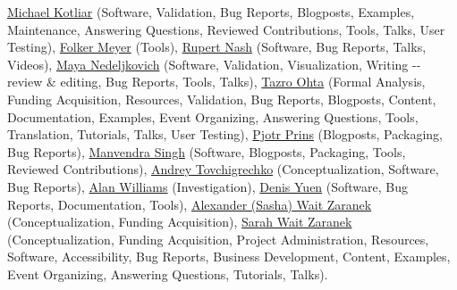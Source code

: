 \documentclass[sigconf,revew,screen,timestamp,nonacm]{acmart}
\newcommand{\contributor}[3]
{\normalsize\href{#1}{#2} \small(#3)\normalsize}
\begin{document}
\begin{acks}
\contributor{https://orcid.org/0000-0002-6486-3898}{Michael Kotliar}{Software, Validation, Bug Reports, Blogposts, Examples, Maintenance, Answering Questions, Reviewed Contributions, Tools, Talks, User Testing},
\contributor{https://orcid.org/0000-0003-1112-2284}{Folker Meyer}{Tools},
\contributor{https://orcid.org/0000-0002-6388-7353}{Rupert Nash}{Software, Bug Reports, Talks, Videos},
\contributor{https://orcid.org/0000-0003-3705-948X}{Maya Nedeljkovich}{Software, Validation, Visualization, Writing -\/- review \& editing, Bug Reports, Tools, Talks},
\contributor{https://orcid.org/0000-0003-3777-5945}{Tazro Ohta}{Formal Analysis, Funding Acquisition, Resources, Validation, Bug Reports, Blogposts, Content, Documentation, Examples, Event Organizing, Answering Questions, Tools, Translation, Tutorials, Talks, User Testing},
\contributor{https://orcid.org/0000-0002-8021-9162}{Pjotr Prins}{Blogposts, Packaging, Bug Reports},
\contributor{https://orcid.org/0000-0001-9279-9910}{Manvendra Singh}{Software, Blogposts, Packaging, Tools, Reviewed Contributions},
\contributor{https://orcid.org/0000-0002-0959-4429}{Andrey Tovchigrechko}{Conceptualization, Software, Bug Reports},
\contributor{https://orcid.org/0000-0003-3156-2105}{Alan Williams}{Investigation},
\contributor{https://orcid.org/0000-0002-6130-1021}{Denis Yuen}{Software, Bug Reports, Documentation, Tools},
\contributor{https://orcid.org/0000-0002-0415-9655}{Alexander (Sasha) Wait Zaranek}{Conceptualization, Funding Acquisition},
\contributor{https://orcid.org/0000-0003-4716-9121}{Sarah Wait Zaranek}{Conceptualization, Funding Acquisition, Project Administration, Resources, Software, Accessibility, Bug Reports, Business Development, Content, Examples, Event Organizing, Answering Questions, Tutorials, Talks}.


\end{acks}
\end{document}
